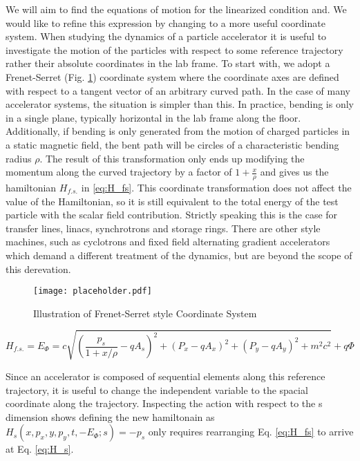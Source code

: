 We will aim to find the equations of motion for the linearized condition and. We would like to refine this expression by changing to a more useful coordinate system. When studying the dynamics of a particle accelerator it is useful to investigate the motion of the particles with respect to some reference trajectory rather their absolute coordinates in the lab frame. To start with, we adopt a Frenet-Serret (Fig. \ref{fig:frenetSerret}) coordinate system where the coordinate axes are defined with respect to a tangent vector of an arbitrary curved path.  In the case of many accelerator systems, the situation is simpler than this. In practice, bending is only in a single plane, typically horizontal in the lab frame along the floor. Additionally, if bending is only generated from the motion of charged particles in a static magnetic field, the bent path will be circles of a characteristic bending radius $\rho$. The result of this transformation only ends up modifying the momentum along the curved trajectory by a factor of $1 + \frac{x}{\rho}$ and gives us the hamiltonian $H_{f.s.}$ in \ref{eq:H_fs}. This coordinate transformation does not affect the value of the Hamiltonian, so it is still equivalent to the total energy of the test particle with the scalar field contribution. Strictly speaking this is the case for transfer lines, linacs, synchrotrons and storage rings. There are other style machines, such as cyclotrons and fixed field alternating gradient accelerators which demand a different treatment of the dynamics, but are beyond the scope of this derevation.

\begin{figure} \label{fig:frenetSerret}
	\centering
	\texttt{[image: placeholder.pdf]}
	\caption{Illustration of Frenet-Serret style Coordinate System}
\end{figure}

\begin{equation} \label{eq:H_fs}
	H_{f.s.} = E_{\Phi} = c\sqrt{\left(\frac{p_s}{1 + x/\rho} - qA_s\right)^2 + (P_x - qA_x)^2 + (P_y- qA_y)^2+ m^2c^2} + q\Phi
\end{equation}

Since an accelerator is composed of sequential elements along this reference trajectory, it is useful to change the independent variable to the spacial coordinate along the trajectory. Inspecting the action with respect to the s dimension shows defining the new hamiltonain as $H_s(x,p_x,y,p_y,t,-E_{\Phi};s) = -p_s$ only requires rearranging Eq. \ref{eq:H_fs} to arrive at Eq. \ref{eq:H_s}.

